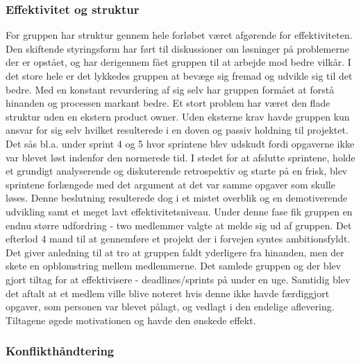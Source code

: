 \subsubsection{Effektivitet og struktur}
For gruppen har struktur gennem hele forløbet været afgørende for effektiviteten. Den skiftende styringsform har ført til diskussioner
 om løsninger på problemerne der er opstået, og har derigennem fået gruppen til at arbejde mod bedre vilkår. I det store hele er det lykkedes gruppen at bevæge
 sig fremad og udvikle sig til det bedre. Med en konstant revurdering af sig selv har gruppen formået at forstå hinanden og processen markant bedre.
Et stort problem har været den flade struktur uden en ekstern product owner. Uden eksterne krav havde gruppen kun ansvar for sig selv hvilket resulterede i en 
doven og passiv holdning til projektet. Det sås bl.a. under sprint 4 og 5 hvor sprintene blev udskudt fordi opgaverne ikke var blevet løst indenfor den 
normerede tid. I stedet for at afslutte  sprintene, holde et grundigt analyserende og diskuterende retrospektiv og starte på en frisk, blev sprintene 
forlængede med det argument at det var samme opgaver som skulle løses. Denne beslutning resulterede dog i et mistet overblik og en demotiverende udvikling 
samt et meget lavt effektivitetsniveau. Under denne fase fik gruppen en endnu større udfordring - two medlemmer valgte at melde sig ud af gruppen.
 Det efterlod 4 mand til at gennemføre et projekt der i forvejen syntes ambitionsfyldt. Det giver anledning til at tro at gruppen faldt yderligere fra hinanden,
 men der skete en opblomstring mellem medlemmerne. Det samlede gruppen og der blev gjort tiltag for at effektivisere - deadlines/sprints på under en uge. 
 Samtidig blev det aftalt at et medlem ville blive noteret hvis denne ikke havde færdiggjort opgaver, som personen var blevet
 pålagt, og vedlagt i den endelige aflevering. Tiltagene øgede motivationen og havde den ønskede effekt.

\subsubsection{Konflikthåndtering}

